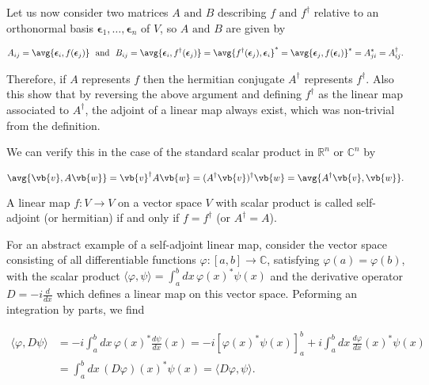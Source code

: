 \documentclass[a4paper,12pt]{report}
\begin{document}
Let us now consider two matrices \(A\text { and } B\) describing \(f \text { and } f^{\dagger} \) relative to an orthonormal basis \(\boldsymbol{\epsilon }_{1}, \ldots , \boldsymbol{\epsilon }_{n}   \) of \(V\), so \(A\text { and } B\) are given by 

\begin{equation}
    A_{ij}= \avg{\boldsymbol{\epsilon }_{i}, f(\boldsymbol{\epsilon }_{j}  )  } ~\text { and }~  B_{ij}=\avg{\boldsymbol{\epsilon }_{i}, f^{\dagger} (\boldsymbol{\epsilon }_{j}  )  }= \avg{f^{\dagger} (\boldsymbol{\epsilon }_{j}  ), \boldsymbol{\epsilon }_{i}  }^{*} = \avg{\boldsymbol{\epsilon }_{j}, f(\boldsymbol{\epsilon } _{i} )  }^{*} = A_{ji}^{*} = A^{\dagger} _{ij}.    
\end{equation}

Therefore, if \(A\) represents \(f\) then the hermitian conjugate \(A^{\dagger} \) represents \(f^{\dagger} \). Also this show that by reversing the above argument and defining \(f^{\dagger} \) as the linear map associated to \(A^{\dagger} \), the adjoint of a linear map always exist, which was non-trivial from the definition.

We can verify this in the case of the standard scalar product in \(\mathbb{R}^{n} \text { or } \mathbb{C}^{n}  \) by

\begin{equation}
    \avg{\vb{v} ,A\vb{w} } = \vb{v} ^{\dagger} A \vb{w}  = (A^{\dagger} \vb{v} )^{\dagger} \vb{w} = \avg{A^{\dagger} \vb{v} ,\vb{w} }.   
\end{equation}

\begin{definition}
A linear map \(f:V \rightarrow V\) on a vector space \(V\) with scalar product is called self-adjoint (or hermitian) if and only if \(f= f^{\dagger} \) (or \(A^{\dagger} = A\)).


\end{definition}

For an abstract example of a self-adjoint linear map, consider the vector space consisting of all differentiable functions $\varphi : [a, b] \to \mathbb{C}$, satisfying $\varphi(a) = \varphi(b)$, with the scalar product \(\langle \varphi, \psi \rangle = \int_a^b dx \, \varphi(x)^* \psi(x)\) and the derivative operator \(D = -i \frac{d}{dx}\) which defines a linear map on this vector space. Peforming an integration by parts, we find

\begin{equation}
\begin{aligned}
\langle \varphi, D\psi \rangle &= -i \int_a^b dx \, \varphi(x)^* \frac{d\psi}{dx}(x) = -i \left[ \varphi(x)^* \psi(x) \right]_{a}^{b} + i \int_a^b dx \, \frac{d\varphi}{dx}(x)^* \psi(x) \\ &= \int_a^b dx \, (D\varphi)(x)^* \psi(x) = \langle D\varphi, \psi \rangle.
\end{aligned}
\end{equation}
\end{document}
